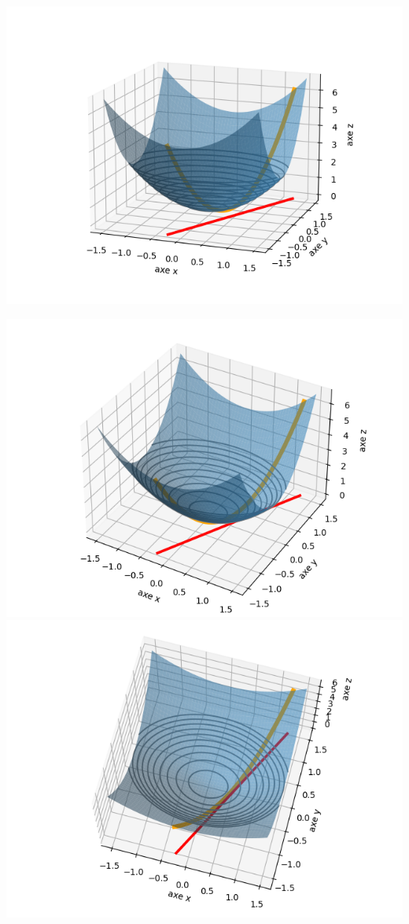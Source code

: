 \documentclass[11pt, class=report,crop=false]{standalone}
\begin{document}
\begin{center}
\includegraphics[scale=\myscale,scale=0.7]{figures/fonctions-extremlie-1a}

\includegraphics[scale=\myscale,scale=0.5]{figures/fonctions-extremlie-1b}
\includegraphics[scale=\myscale,scale=0.5]{figures/fonctions-extremlie-1c}
\end{center}
\end{document}
